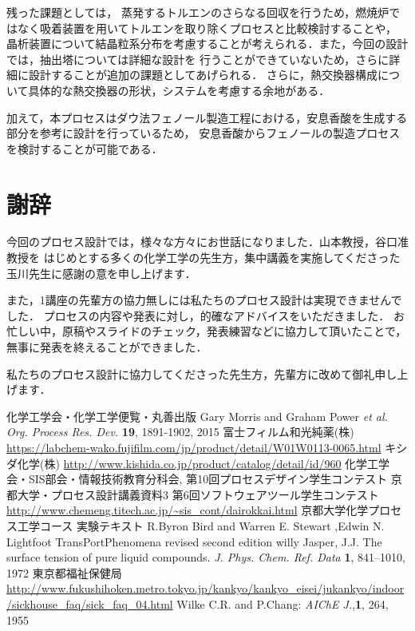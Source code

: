 \documentclass[a4j]{jsreport}
\begin{document}
残った課題としては，
蒸発するトルエンのさらなる回収を行うため，燃焼炉ではなく吸着装置を用いてトルエンを取り除くプロセスと比較検討することや，
晶析装置について結晶粒系分布を考慮することが考えられる．また，今回の設計では，抽出塔については詳細な設計を
行うことができていないため，さらに詳細に設計することが追加の課題としてあげられる．
さらに，熱交換器構成について具体的な熱交換器の形状，システムを考慮する余地がある．

加えて，本プロセスはダウ法フェノール製造工程における，安息香酸を生成する部分を参考に設計を行っているため，
安息香酸からフェノールの製造プロセスを検討することが可能である．


\clearpage
\chapter*{謝辞}
今回のプロセス設計では，様々な方々にお世話になりました．山本教授，谷口准教授を
はじめとする多くの化学工学の先生方，集中講義を実施してくださった玉川先生に感謝の意を申し上げます．

また，1講座の先輩方の協力無しには私たちのプロセス設計は実現できませんでした．
プロセスの内容や発表に対し，的確なアドバイスをいただきました．
お忙しい中，原稿やスライドのチェック，発表練習などに協力して頂いたことで，無事に発表を終えることができました．

私たちのプロセス設計に協力してくださった先生方，先輩方に改めて御礼申し上げます．


\clearpage

\begin{thebibliography}{10}
     化学工学会・化学工学便覧・丸善出版
     Gary Morris and  Graham Power \textit{et al.  Org. Process Res. Dev.} \textbf{19}, 1891-1902, 2015
     富士フィルム和光純薬(株) \url{https://labchem-wako.fujifilm.com/jp/product/detail/W01W0113-0065.html}
     キシダ化学(株) \url{http://www.kishida.co.jp/product/catalog/detail/id/960}
     化学工学会・SIS部会・情報技術教育分科会, 第10回プロセスデザイン学生コンテスト
     京都大学・プロセス設計講義資料3
     第6回ソフトウェアツール学生コンテスト \url{http://www.chemeng.titech.ac.jp/~sis_cont/dairokkai.html}
     京都大学化学プロセス工学コース 実験テキスト
     R.Byron Bird and Warren E. Stewart ,Edwin N. Lightfoot   TransPortPhenomena revised second edition   willy
     Jasper, J.J. The surface tension of pure liquid compounds. \textit{J. Phys. Chem. Ref. Data} \textbf{1}, 841–1010, 1972
    東京都福祉保健局 \url{http://www.fukushihoken.metro.tokyo.jp/kankyo/kankyo_eisei/jukankyo/indoor/sickhouse_faq/sick_faq_04.html}
    Wilke C.R. and P.Chang: \textit{AIChE J.},\textbf{1}, 264, 1955
  \end{thebibliography}
\end{document}
